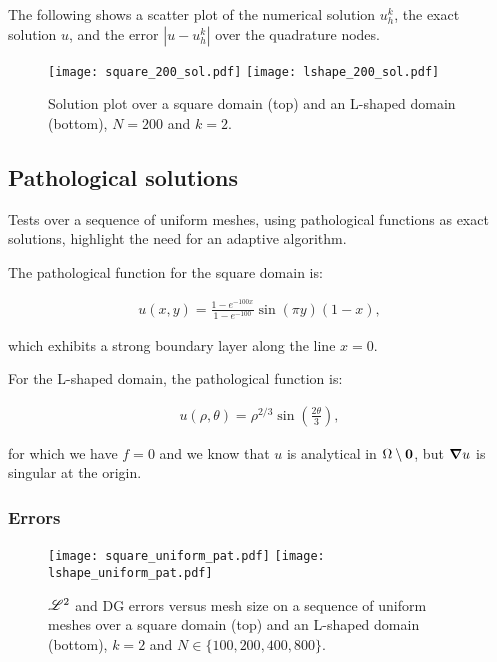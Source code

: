 The following shows a scatter plot of the numerical solution $u^k_h$, the exact solution $u$, and the error $|u - u^k_h|$ over the quadrature nodes.

\begin{figure}[!ht]
	\centering
	\texttt{[image: square\_200\_sol.pdf]}
    \texttt{[image: lshape\_200\_sol.pdf]}
	\caption{Solution plot over a square domain (top) and an L-shaped domain (bottom), $N = 200$ and $k = 2$.}
\end{figure}

\newpage
\subsection{Pathological solutions}

Tests over a sequence of uniform meshes, using pathological functions as exact solutions, highlight the need for an adaptive algorithm.

\cite{Antonietti2013} The pathological function for the square domain is:

\begin{gather}
    u(x, y) = \frac{1 - e^{-100x}}{1 - e^{-100}} \sin(\pi y) (1 - x),
\end{gather}

which exhibits a strong boundary layer along the line $x = 0$.

For the L-shaped domain, the pathological function is:

\begin{gather}
    u(\rho, \theta) = \rho^{2 / 3} \sin\left(\frac{2 \theta}{3}\right),
\end{gather}

for which we have $f = 0$ and we know that $u$ is analytical in $\Omega \setminus \bm{0}$, but $\bm{\nabla}{u}$ is singular at the origin.

\newpage
\subsubsection{Errors}

\begin{figure}[!ht]
	\centering
	\texttt{[image: square\_uniform\_pat.pdf]}
    \texttt{[image: lshape\_uniform\_pat.pdf]}
	\caption{$\mathscr{L}^2$ and DG errors versus mesh size on a sequence of uniform meshes over a square domain (top) and an L-shaped domain (bottom), $k = 2$ and $N \in \{100, 200, 400, 800\}$.}
\end{figure}

